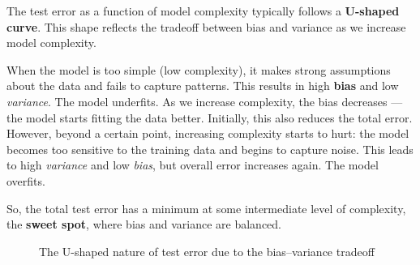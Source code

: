 The test error as a function of model complexity typically follows a \textbf{U-shaped curve}. This shape reflects the tradeoff between bias and variance as we increase model complexity.

When the model is too simple (low complexity), it makes strong assumptions about the data and fails to capture patterns. This results in high \textbf{bias} and low \textit{variance}. The model underfits. As we increase complexity, the bias decreases — the model starts fitting the data better. Initially, this also reduces the total error. However, beyond a certain point, increasing complexity starts to hurt: the model becomes too sensitive to the training data and begins to capture noise. This leads to high \textit{variance} and low \textit{bias}, but overall error increases again. The model overfits.

So, the total test error has a minimum at some intermediate level of complexity, the \textbf{sweet spot}, where bias and variance are balanced.


\begin{figure}[h!]
\centering
{}
\caption{The U-shaped nature of test error due to the bias–variance tradeoff}
\end{figure}
